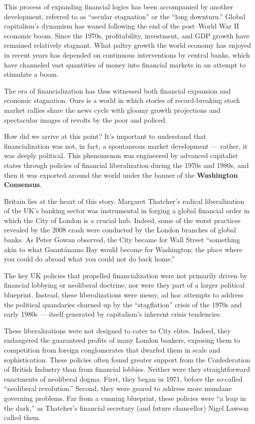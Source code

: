 \documentclass[
]{book}
\begin{document}
This process of expanding financial logics has been accompanied by another development, referred to as ``secular stagnation'' or the ``long downturn.'' Global capitalism's dynamism has waned following the end of the post--World War II economic boom. Since the 1970s, profitability, investment, and GDP growth have remained relatively stagnant. What paltry growth the world economy has enjoyed in recent years has depended on continuous interventions by central banks, which have channeled vast quantities of money into financial markets in an attempt to stimulate a boom.

The era of financialization has thus witnessed both financial expansion and economic stagnation. Ours is a world in which stories of record-breaking stock market rallies share the news cycle with gloomy growth projections and spectacular images of revolts by the poor and policed.

How did we arrive at this point? It's important to understand that financialization was not, in fact, a spontaneous market development --- rather, it was deeply political. This phenomenon was engineered by advanced capitalist states through policies of financial liberalization during the 1970s and 1980s, and then it was exported around the world under the banner of the \textbf{Washington Consensus}.

Britain lies at the heart of this story. Margaret Thatcher's radical liberalization of the UK's banking sector was instrumental in forging a global financial order in which the City of London is a crucial hub. Indeed, some of the worst practices revealed by the 2008 crash were conducted by the London branches of global banks. As Peter Gowan observed, the City became for Wall Street ``something akin to what Guantánamo Bay would become for Washington: the place where you could do abroad what you could not do back home.''

The key UK policies that propelled financialization were not primarily driven by financial lobbying or neoliberal doctrine, nor were they part of a larger political blueprint. Instead, these liberalizations were messy, ad hoc attempts to address the political quandaries churned up by the ``stagflation'' crisis of the 1970s and early 1980s --- itself generated by capitalism's inherent crisis tendencies.

These liberalizations were not designed to cater to City elites. Indeed, they endangered the guaranteed profits of many London bankers, exposing them to competition from foreign conglomerates that dwarfed them in scale and sophistication. These policies often found greater support from the Confederation of British Industry than from financial lobbies. Neither were they straightforward enactments of neoliberal dogma. First, they began in 1971, before the so-called ``neoliberal revolution.'' Second, they were geared to address more mundane governing problems. Far from a cunning blueprint, these policies were ``a leap in the dark,'' as Thatcher's financial secretary (and future chancellor) Nigel Lawson called them.
\end{document}
